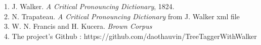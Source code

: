 \begin{multicols}{2}

\begin{center}
1. J. Walker. \textit{A Critical Pronouncing Dictionary}, 1824. \\[2mm]

2. N. Trapateau. \textit{A Critical Pronouncing Dictionary} from J. Walker xml file\\[2mm]

3. W. N. Francis and H. Kucera. \textit{Brown Corpus}\\[2mm]

4. The project's Github : https://github.com/daothauvin/TreeTaggerWithWalker
\end{center}
\end{multicols}